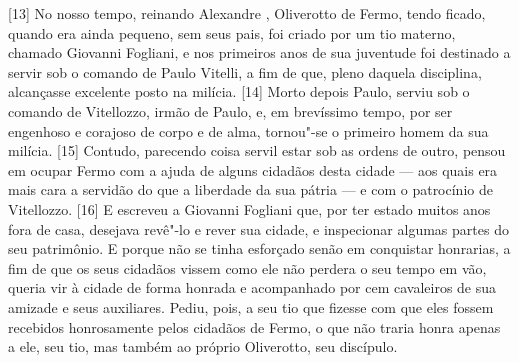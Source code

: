 {[}13{]} No nosso tempo, reinando Alexandre , Oliverotto de
Fermo, tendo ficado, quando era ainda pequeno, sem seus pais, foi
criado por um tio materno, chamado Giovanni Fogliani, e nos primeiros
anos de sua juventude foi destinado a servir sob o comando de Paulo
Vitelli, a fim de que, pleno daquela disciplina,
alcançasse excelente posto na milícia. {[}14{]} Morto depois Paulo,
serviu sob o comando de Vitellozzo, irmão de Paulo, e, em brevíssimo
tempo, por ser engenhoso e corajoso de corpo e de alma, tornou"-se o
primeiro homem da sua
milícia. {[}15{]} Contudo, parecendo coisa servil estar sob as ordens de
outro, pensou em ocupar Fermo com a ajuda de alguns cidadãos desta
cidade --- aos quais era mais cara a servidão do que a liberdade da sua
pátria --- e com o patrocínio de Vitellozzo. {[}16{]} E escreveu a
Giovanni Fogliani que, por ter estado muitos anos fora de casa, desejava
revê"-lo e rever sua cidade, e inspecionar algumas partes do seu
patrimônio. E porque não se tinha esforçado senão em conquistar
honrarias, a fim de que os seus cidadãos vissem como ele não perdera o
seu tempo em vão, queria vir à cidade de forma honrada e acompanhado por
cem cavaleiros de sua amizade e seus auxiliares. Pediu, pois, a seu tio
que fizesse com que eles fossem recebidos honrosamente pelos cidadãos de
Fermo, o que não traria honra apenas a ele, seu tio, mas também ao
próprio Oliverotto, seu discípulo.

